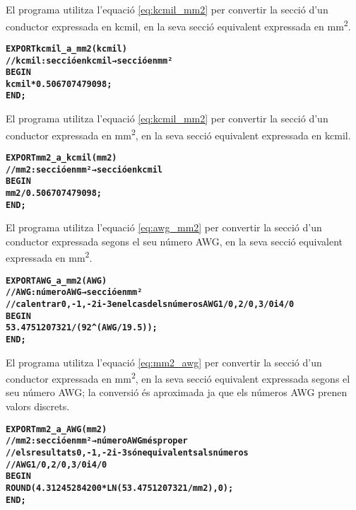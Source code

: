 El programa  utilitza l'equació \eqref{eq:kcmil_mm2} per convertir la secció d'un conductor expressada en \si{kcmil}, en la seva secció equivalent expressada en \si{mm^2}.
\vspace{-6mm}
\begin{alltt}
\bfseries
{}
    EXPORT kcmil_a_mm2(kcmil)
    // kcmil:secció en kcmil → secció en mm²
    BEGIN
      kcmil*0.506707479098;
    END;
\end{alltt}

El programa  utilitza l'equació \eqref{eq:kcmil_mm2} per convertir la secció d'un conductor expressada en \si{mm^2}, en la seva secció equivalent expressada en \si{kcmil}.
\vspace{-6mm}
\begin{alltt}
\bfseries
{}
    EXPORT mm2_a_kcmil(mm2)
    // mm2:secció en mm² → secció en kcmil
    BEGIN
      mm2/0.506707479098;
    END;
\end{alltt}

El programa  utilitza l'equació \eqref{eq:awg_mm2} per convertir la secció d'un conductor expressada segons el seu número AWG, en la seva secció equivalent expressada en \si{mm^2}.
\vspace{-6mm}
\begin{alltt}
\bfseries
{}
    EXPORT AWG_a_mm2(AWG)
    // AWG:número AWG → secció en mm²
    // cal entrar 0, -1, -2 i -3 en el cas dels números AWG 1/0, 2/0, 3/0 i 4/0
    BEGIN
      53.4751207321/(92^(AWG/19.5));
    END;
\end{alltt}

El programa  utilitza l'equació \eqref{eq:mm2_awg} per convertir la secció d'un conductor expressada en \si{mm^2}, en la seva secció equivalent expressada segons el seu número AWG; la conversió és aproximada ja que els números AWG prenen valors discrets.
\vspace{-6mm}
\begin{alltt}
\bfseries
{}
    EXPORT mm2_a_AWG(mm2)
    // mm2:secció en mm² → número AWG més proper
    // els resultats 0, -1, -2 i -3 són equivalents als números
    // AWG 1/0, 2/0, 3/0 i 4/0
    BEGIN
      ROUND(4.31245284200*LN(53.4751207321/mm2),0);
    END;
\end{alltt}


